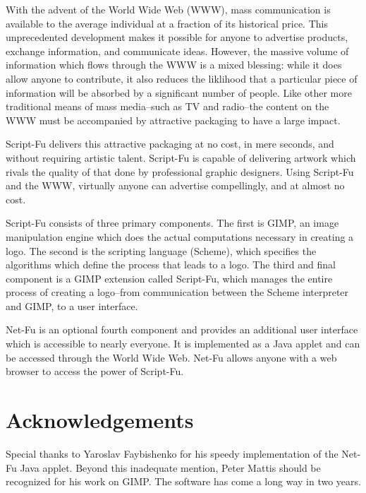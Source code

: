 \documentclass{article}
\begin{document}
With the advent of the World Wide Web (WWW), mass communication is
available to the average individual at a fraction of its historical
price.  This unprecedented development makes it possible for anyone to
advertise products, exchange information, and communicate ideas.
However, the massive volume of information which flows through the WWW
is a mixed blessing: while it does allow anyone to contribute, it also
reduces the liklihood that a particular piece of information will be
absorbed by a significant number of people.  Like other more
traditional means of mass media--such as TV and radio--the content on
the WWW must be accompanied by attractive packaging to have a large
impact.

Script-Fu delivers this attractive packaging at no cost, in mere
seconds, and without requiring artistic talent.  Script-Fu is capable
of delivering artwork which rivals the quality of that done by
professional graphic designers.  Using Script-Fu and the WWW,
virtually anyone can advertise compellingly, and at almost no cost.

Script-Fu consists of three primary components.  The first is GIMP, an
image manipulation engine which does the actual computations necessary
in creating a logo.  The second is the scripting language (Scheme),
which specifies the algorithms which define the process that leads to
a logo.  The third and final component is a GIMP extension called
Script-Fu, which manages the entire process of creating a logo--from
communication between the Scheme interpreter and GIMP, to a user
interface.

Net-Fu is an optional fourth component and provides an additional user
interface which is accessible to nearly everyone.  It is implemented
as a Java applet and can be accessed through the World Wide Web.
Net-Fu allows anyone with a web browser to access the power of
Script-Fu.

\section{Acknowledgements}
Special thanks to Yaroslav Faybishenko for his speedy implementation
of the Net-Fu Java applet.  Beyond this inadequate mention, Peter
Mattis should be recognized for his work on GIMP.  The software has
come a long way in two years.
\end{document}
